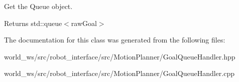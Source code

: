 Get the Queue object. 

\begin{DoxyReturn}{Returns}
std\+::queue$<$raw\+Goal$>$ 
\end{DoxyReturn}


The documentation for this class was generated from the following files\+:\begin{DoxyCompactItemize}
\item 
world\+\_\+ws/src/robot\+\_\+interface/src/\+Motion\+Planner/Goal\+Queue\+Handler.\+hpp\item 
world\+\_\+ws/src/robot\+\_\+interface/src/\+Motion\+Planner/Goal\+Queue\+Handler.\+cpp\end{DoxyCompactItemize}
